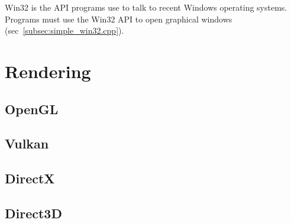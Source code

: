 \documentclass{article}
\begin{document}
Win32 is the API programs use to talk to recent Windows operating systems.
Programs must use the Win32 API to open graphical windows
(sec~\ref{subsec:simple_win32.cpp}).


\section{Rendering}
\label{sec:rendering}


\subsection{OpenGL}
\label{subsec:opengl}


\subsection{Vulkan}
\label{subsec:vulkan}


\subsection{DirectX}
\label{subsec:directx}


\subsection{Direct3D}
\label{subsec:direct3d}

\end{document}
